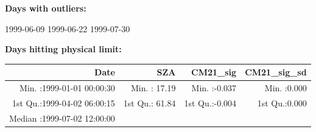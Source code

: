 \documentclass[
  10pt,
  a4paper,oneside]{article}
\begin{document}
\normalsize

\textbf{Days with outliers:}

1999-06-09 1999-06-22 1999-07-30

\textbf{Days hitting physical limit:}

\footnotesize

\begin{longtable}[]{@{}rrrr@{}}
\toprule
\begin{minipage}[b]{0.33\columnwidth}\raggedleft
Date\strut
\end{minipage} & \begin{minipage}[b]{0.19\columnwidth}\raggedleft
SZA\strut
\end{minipage} & \begin{minipage}[b]{0.19\columnwidth}\raggedleft
CM21\_sig\strut
\end{minipage} & \begin{minipage}[b]{0.19\columnwidth}\raggedleft
CM21\_sig\_sd\strut
\end{minipage}\tabularnewline
\midrule
\endhead
\begin{minipage}[t]{0.33\columnwidth}\raggedleft
Min. :1999-01-01 00:00:30\strut
\end{minipage} & \begin{minipage}[t]{0.19\columnwidth}\raggedleft
Min. : 17.19\strut
\end{minipage} & \begin{minipage}[t]{0.19\columnwidth}\raggedleft
Min. :-0.037\strut
\end{minipage} & \begin{minipage}[t]{0.19\columnwidth}\raggedleft
Min. :0.000\strut
\end{minipage}\tabularnewline
\begin{minipage}[t]{0.33\columnwidth}\raggedleft
1st Qu.:1999-04-02 06:00:15\strut
\end{minipage} & \begin{minipage}[t]{0.19\columnwidth}\raggedleft
1st Qu.: 61.84\strut
\end{minipage} & \begin{minipage}[t]{0.19\columnwidth}\raggedleft
1st Qu.:-0.004\strut
\end{minipage} & \begin{minipage}[t]{0.19\columnwidth}\raggedleft
1st Qu.:0.000\strut
\end{minipage}\tabularnewline
\begin{minipage}[t]{0.33\columnwidth}\raggedleft
Median :1999-07-02 12:00:00\strut
\end{minipage} & \begin{minipage}[t]{0.19\columnwidth}\raggedleft

\end{minipage}
\end{longtable}
\end{document}
